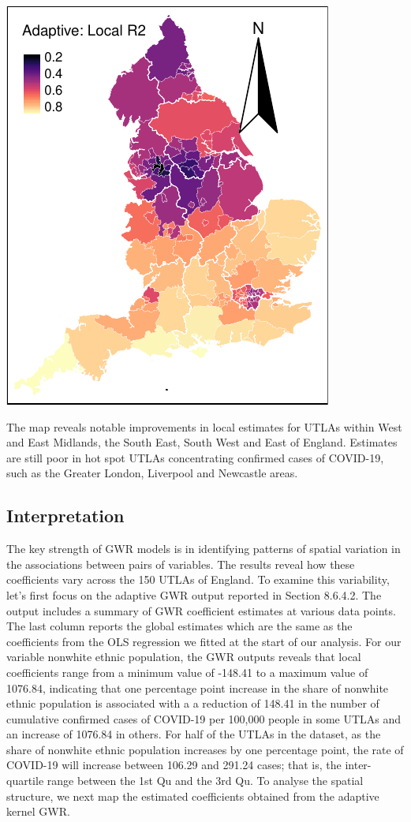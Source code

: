 \documentclass[
  letterpaper,
  DIV=11,
  numbers=noendperiod,
  oneside]{scrreprt}
\begin{document}
\includegraphics{09-gwr_files/figure-pdf/unnamed-chunk-16-1.pdf}

The map reveals notable improvements in local estimates for UTLAs within
West and East Midlands, the South East, South West and East of England.
Estimates are still poor in hot spot UTLAs concentrating confirmed cases
of COVID-19, such as the Greater London, Liverpool and Newcastle areas.

\subsection{Interpretation}\label{interpretation-1}

The key strength of GWR models is in identifying patterns of spatial
variation in the associations between pairs of variables. The results
reveal how these coefficients vary across the 150 UTLAs of England. To
examine this variability, let's first focus on the adaptive GWR output
reported in Section 8.6.4.2. The output includes a summary of GWR
coefficient estimates at various data points. The last column reports
the global estimates which are the same as the coefficients from the OLS
regression we fitted at the start of our analysis. For our variable
nonwhite ethnic population, the GWR outputs reveals that local
coefficients range from a minimum value of -148.41 to a maximum value of
1076.84, indicating that one percentage point increase in the share of
nonwhite ethnic population is associated with a a reduction of 148.41 in
the number of cumulative confirmed cases of COVID-19 per 100,000 people
in some UTLAs and an increase of 1076.84 in others. For half of the
UTLAs in the dataset, as the share of nonwhite ethnic population
increases by one percentage point, the rate of COVID-19 will increase
between 106.29 and 291.24 cases; that is, the inter-quartile range
between the 1st Qu and the 3rd Qu. To analyse the spatial structure, we
next map the estimated coefficients obtained from the adaptive kernel
GWR.
\end{document}
